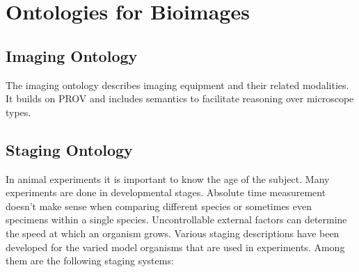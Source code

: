 
\chapter{Ontologies for Bioimages} %

\label{Chapter 3} %



\section{Imaging Ontology}

The imaging ontology describes imaging
equipment and their related
modalities. It builds on PROV and includes
semantics to facilitate reasoning
over microscope types.


\section{Staging Ontology}

In animal experiments it is important to
know the age of the subject. Many experiments are done in
developmental stages. Absolute time
measurement doesn't make sense when comparing different species or
sometimes even specimens within a single species. Uncontrollable
external factors can determine the speed at which an organism
grows. Various staging descriptions have been developed for the varied
model organisms that are used in experiments. Among them are the
following staging systems:

